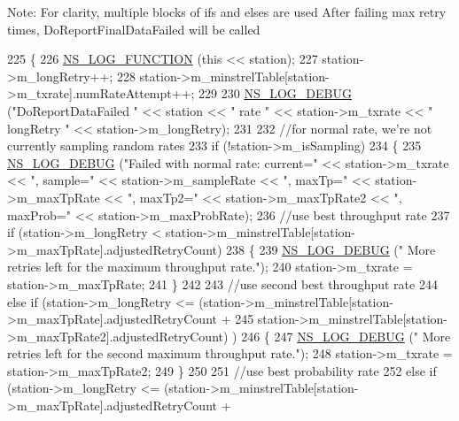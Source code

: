Note\+: For clarity, multiple blocks of if\textquotesingle{}s and else\textquotesingle{}s are used After failing max retry times, Do\+Report\+Final\+Data\+Failed will be called 
\begin{DoxyCode}
225 \{
226   \hyperlink{log-macros-disabled_8h_a90b90d5bad1f39cb1b64923ea94c0761}{NS\_LOG\_FUNCTION} (\textcolor{keyword}{this} << station);
227   station->m\_longRetry++;
228   station->m\_minstrelTable[station->m\_txrate].numRateAttempt++;
229 
230   \hyperlink{group__logging_ga413f1886406d49f59a6a0a89b77b4d0a}{NS\_LOG\_DEBUG} (\textcolor{stringliteral}{"DoReportDataFailed "} << station << \textcolor{stringliteral}{" rate "} << station->m\_txrate << \textcolor{stringliteral}{"
       longRetry "} << station->m\_longRetry);
231 
232   \textcolor{comment}{//for normal rate, we're not currently sampling random rates}
233   \textcolor{keywordflow}{if} (!station->m\_isSampling)
234     \{
235       \hyperlink{group__logging_ga413f1886406d49f59a6a0a89b77b4d0a}{NS\_LOG\_DEBUG} (\textcolor{stringliteral}{"Failed with normal rate: current="} << station->m\_txrate << \textcolor{stringliteral}{", sample="} << 
      station->m\_sampleRate << \textcolor{stringliteral}{", maxTp="} << station->m\_maxTpRate << \textcolor{stringliteral}{", maxTp2="} << station->m\_maxTpRate2 << \textcolor{stringliteral}{",
       maxProb="} << station->m\_maxProbRate);
236       \textcolor{comment}{//use best throughput rate}
237       \textcolor{keywordflow}{if} (station->m\_longRetry < station->m\_minstrelTable[station->m\_maxTpRate].adjustedRetryCount)
238         \{
239           \hyperlink{group__logging_ga413f1886406d49f59a6a0a89b77b4d0a}{NS\_LOG\_DEBUG} (\textcolor{stringliteral}{" More retries left for the maximum throughput rate."});
240           station->m\_txrate = station->m\_maxTpRate;
241         \}
242 
243       \textcolor{comment}{//use second best throughput rate}
244       \textcolor{keywordflow}{else} \textcolor{keywordflow}{if} (station->m\_longRetry <= (station->m\_minstrelTable[station->m\_maxTpRate].adjustedRetryCount +
245                                         station->m\_minstrelTable[station->m\_maxTpRate2].adjustedRetryCount)
      )
246         \{
247           \hyperlink{group__logging_ga413f1886406d49f59a6a0a89b77b4d0a}{NS\_LOG\_DEBUG} (\textcolor{stringliteral}{" More retries left for the second maximum throughput rate."});
248           station->m\_txrate = station->m\_maxTpRate2;
249         \}
250 
251       \textcolor{comment}{//use best probability rate}
252       \textcolor{keywordflow}{else} \textcolor{keywordflow}{if} (station->m\_longRetry <= (station->m\_minstrelTable[station->m\_maxTpRate].adjustedRetryCount +

\end{DoxyCode}
